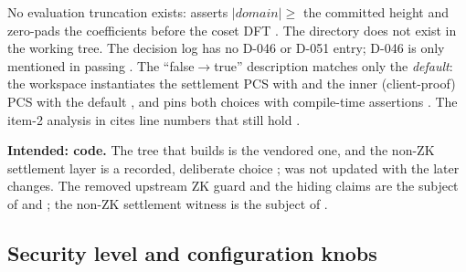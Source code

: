 \begin{specdelta}
No evaluation truncation exists:  asserts
$|\mathit{domain}| \ge$ the committed height and zero-pads the coefficients
before the coset DFT
. The
directory  does not exist in the working tree. The
decision log has no D-046 or D-051 entry; D-046 is only mentioned in passing
. The ``false$\to$true''
description matches only the \emph{default}: the workspace instantiates the
settlement PCS with 
 and the inner (client-proof)
PCS with the default , and
pins both choices with compile-time assertions
. The item-2 analysis in
 cites line numbers that still hold
.

\textbf{Intended: code.} The tree that builds is the vendored one, and the
non-ZK settlement layer is a recorded, deliberate choice
;  was not updated with
the later changes. The removed upstream ZK guard and the hiding claims are
the subject of  and ; the non-ZK settlement
witness is the subject of .
\end{specdelta}

\subsection{Security level and configuration knobs}
\label{subsec:delta-security}

